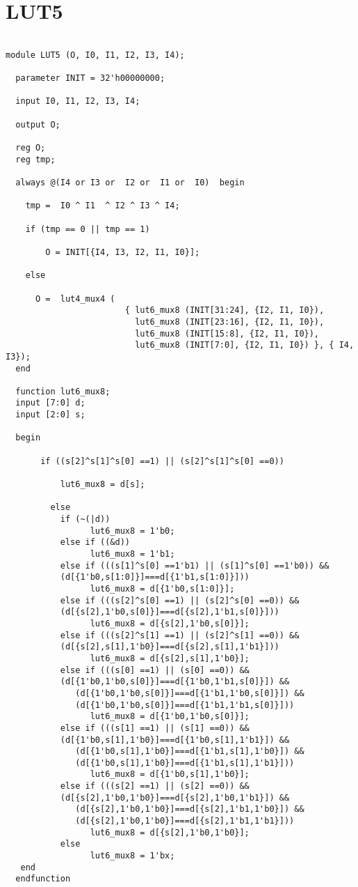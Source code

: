 \section{LUT5}
\begin{lstlisting}

module LUT5 (O, I0, I1, I2, I3, I4);

  parameter INIT = 32'h00000000;

  input I0, I1, I2, I3, I4;

  output O;

  reg O;
  reg tmp;

  always @(I4 or I3 or  I2 or  I1 or  I0)  begin
 
    tmp =  I0 ^ I1  ^ I2 ^ I3 ^ I4;

    if (tmp == 0 || tmp == 1)

        O = INIT[{I4, I3, I2, I1, I0}];

    else 
    
      O =  lut4_mux4 (
                        { lut6_mux8 (INIT[31:24], {I2, I1, I0}),
                          lut6_mux8 (INIT[23:16], {I2, I1, I0}),
                          lut6_mux8 (INIT[15:8], {I2, I1, I0}),
                          lut6_mux8 (INIT[7:0], {I2, I1, I0}) }, { I4, I3});
  end

  function lut6_mux8;
  input [7:0] d;
  input [2:0] s;
   
  begin

       if ((s[2]^s[1]^s[0] ==1) || (s[2]^s[1]^s[0] ==0))
           
           lut6_mux8 = d[s];

         else
           if (~(|d))
                 lut6_mux8 = 1'b0;
           else if ((&d))
                 lut6_mux8 = 1'b1;
           else if (((s[1]^s[0] ==1'b1) || (s[1]^s[0] ==1'b0)) &&
           (d[{1'b0,s[1:0]}]===d[{1'b1,s[1:0]}]))
                 lut6_mux8 = d[{1'b0,s[1:0]}];
           else if (((s[2]^s[0] ==1) || (s[2]^s[0] ==0)) && 
           (d[{s[2],1'b0,s[0]}]===d[{s[2],1'b1,s[0]}]))
                 lut6_mux8 = d[{s[2],1'b0,s[0]}];
           else if (((s[2]^s[1] ==1) || (s[2]^s[1] ==0)) && 
           (d[{s[2],s[1],1'b0}]===d[{s[2],s[1],1'b1}]))
                 lut6_mux8 = d[{s[2],s[1],1'b0}];
           else if (((s[0] ==1) || (s[0] ==0)) &&
           (d[{1'b0,1'b0,s[0]}]===d[{1'b0,1'b1,s[0]}]) &&
              (d[{1'b0,1'b0,s[0]}]===d[{1'b1,1'b0,s[0]}]) && 
              (d[{1'b0,1'b0,s[0]}]===d[{1'b1,1'b1,s[0]}]))
                 lut6_mux8 = d[{1'b0,1'b0,s[0]}];
           else if (((s[1] ==1) || (s[1] ==0)) &&
           (d[{1'b0,s[1],1'b0}]===d[{1'b0,s[1],1'b1}]) &&
              (d[{1'b0,s[1],1'b0}]===d[{1'b1,s[1],1'b0}]) && 
              (d[{1'b0,s[1],1'b0}]===d[{1'b1,s[1],1'b1}]))
                 lut6_mux8 = d[{1'b0,s[1],1'b0}];
           else if (((s[2] ==1) || (s[2] ==0)) && 
           (d[{s[2],1'b0,1'b0}]===d[{s[2],1'b0,1'b1}]) &&
              (d[{s[2],1'b0,1'b0}]===d[{s[2],1'b1,1'b0}]) && 
              (d[{s[2],1'b0,1'b0}]===d[{s[2],1'b1,1'b1}]))
                 lut6_mux8 = d[{s[2],1'b0,1'b0}];
           else
                 lut6_mux8 = 1'bx;
   end
  endfunction



\end{lstlisting}
